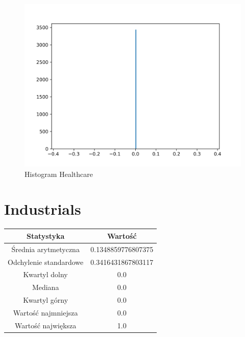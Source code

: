 \documentclass{article}
\begin{document}
\begin{figure}[h!]
    \includegraphics[width=\linewidth]{variables/Healthcare.png}
    \caption{Histogram Healthcare }
\end{figure}\section{ Industrials }

\begin{center}
    \begin{tabular}{|c | c|} 
    \hline
    Statystyka & Wartość \\
    \hline\hline
    Średnia arytmetyczna & 0.1348859776807375 \\ 
    \hline
    Odchylenie standardowe & 0.3416431867803117 \\
    \hline
    Kwartyl dolny & 0.0 \\
    \hline
    Mediana & 0.0 \\
    \hline
    Kwartyl górny & 0.0 \\
    \hline
    Wartość najmniejsza & 0.0 \\
    \hline
    Wartość największa & 1.0 \\
    \hline
   \end{tabular}
\end{center}
\end{document}
